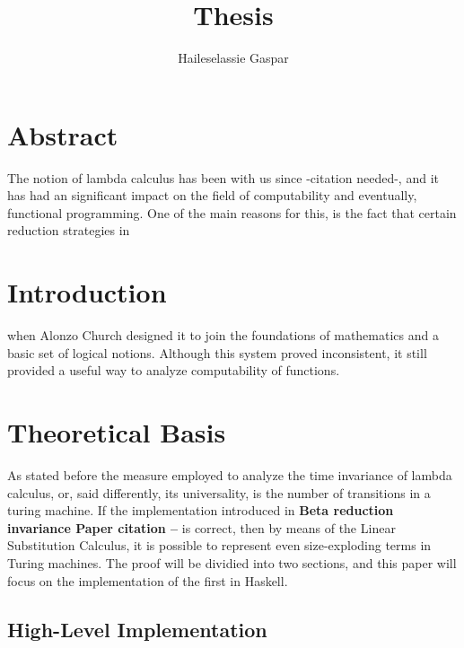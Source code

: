 \documentclass[12pt]{article}
\title{Thesis}
\author{Haileselassie Gaspar}
\begin{document}
\maketitle

\section{Abstract}
The notion of lambda calculus has been with us since -citation needed-, and it has had an significant impact on the field of computability and eventually, functional
programming. One of the main reasons for this, is the fact that certain reduction strategies in
\section{Introduction}
when Alonzo Church designed it to join the foundations
of mathematics and a basic set of logical notions. Although this system proved inconsistent, it still provided a useful way to analyze computability of functions. 
\section{Theoretical Basis}
As stated before the measure employed to analyze the time invariance of lambda calculus, or, said differently, its universality, is the number of transitions in a turing machine. If the implementation introduced in \textbf{Beta reduction invariance Paper citation --} is correct, then by means of the Linear Substitution Calculus, it is possible to represent even size-exploding terms in Turing machines. The proof will be dividied into two sections, and this paper will focus on the implementation of the first in Haskell.
\subsection{High-Level Implementation}
\end{document}
